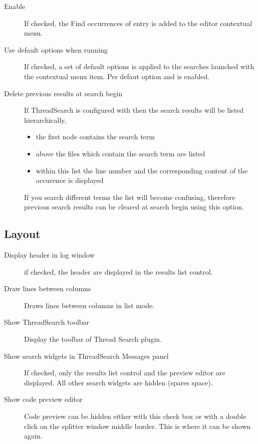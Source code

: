 \begin{description}
\item[Enable ] If checked, the Find occurrences of  entry is added to the editor contextual menu.
\item[Use default options when running ] If checked, a set of default options is applied to the searches launched with the  contextual menu item. Per defaut option  and  is enabled.
\item[Delete previous results at search begin] If ThreadSearch is configured with  then the search results will be listed hierarchically,
\begin{itemize}
\item the first node contains the search term
\item above the files which contain the search term are listed
\item within this list the line number and the corresponding content of the occurence is displayed
\end{itemize}
If you search different terms the list will become confusing, therefore previous search results can be cleared at search begin using this option.
\end{description}

\subsection{Layout}

\begin{description}
\item[Display header in log window] if checked, the header are displayed in the results list control.
\item[Draw lines between columns] Draws lines between columns in list mode.
\item[Show ThreadSearch toolbar] Display the toolbar of Thread Search plugin.
\item[Show search widgets in ThreadSearch Messages panel] If checked, only the results list control and the preview editor are displayed. All other search widgets are hidden (spares space).
\item[Show code preview editor] Code preview can be hidden either with this check box or with a double click on the splitter window middle border. This is where it can be shown again.
\end{description}

